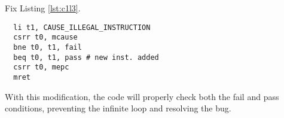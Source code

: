 \begin{listing}[h]
\caption{Fix Listing \ref{lst:c1l3}.}
\label{lst:c1l3_fix}
\begin{verbatim}
  li t1, CAUSE_ILLEGAL_INSTRUCTION
  csrr t0, mcause
  bne t0, t1, fail
  beq t0, t1, pass # new inst. added
  csrr t0, mepc
  mret
\end{verbatim}
\end{listing}

With this modification, the code will properly check both the fail and pass conditions, preventing the infinite loop and resolving the bug.
